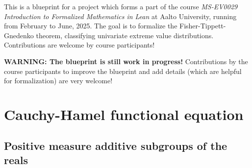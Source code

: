 
%

This is a blueprint for a project which forms a part of the course
\emph{MS-EV0029 Introduction to Formalized Mathematics in Lean}
at Aalto University, running from February to June, 2025.
The goal is to formalize the Fisher-Tippett-Gnedenko theorem,
classifying univariate extreme value distributions.
Contributions are welcome by course participants!

\textbf{WARNING: The blueprint is still work in progress!}
Contributions by the course participants
to improve the blueprint and add details
(which are helpful for formalization) are very welcome!




















\chapter{Cauchy-Hamel functional equation}

\section{Positive measure additive subgroups of the reals}

